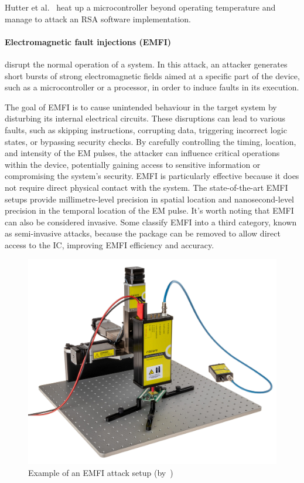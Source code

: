 Hutter et al.~\cite{HS-14-cardis} heat up a microcontroller beyond operating temperature and manage to attack an RSA software implementation.

\paragraph{Electromagnetic fault injections (EMFI)} disrupt the normal operation of a system. In this attack, an attacker generates short bursts of strong electromagnetic fields aimed at a specific part of the device, such as a microcontroller or a processor, in order to induce faults in its execution.

The goal of EMFI is to cause unintended behaviour in the target system by disturbing its internal electrical circuits. These disruptions can lead to various faults, such as skipping instructions, corrupting data, triggering incorrect logic states, or bypassing security checks. By carefully controlling the timing, location, and intensity of the EM pulses, the attacker can influence critical operations within the device, potentially gaining access to sensitive information or compromising the system's security.
EMFI is particularly effective because it does not require direct physical contact with the system. The state-of-the-art EMFI setups provide millimetre-level precision in spatial location and nanosecond-level precision in the temporal location of the EM pulse.
It's worth noting that EMFI can also be considered invasive. Some classify EMFI into a third category, known as semi-invasive attacks, because the package can be removed to allow direct access to the IC, improving EMFI efficiency and accuracy.

\begin{figure}[ht]
    \centering
    \includegraphics[width=.5\textwidth]{c2_soa/img/emfi_riscure_setup.jpg}
    \caption{Example of an EMFI attack setup (by~\cite{riscure_emfi})}
    \label{fig:emfi_setup}
\end{figure}

